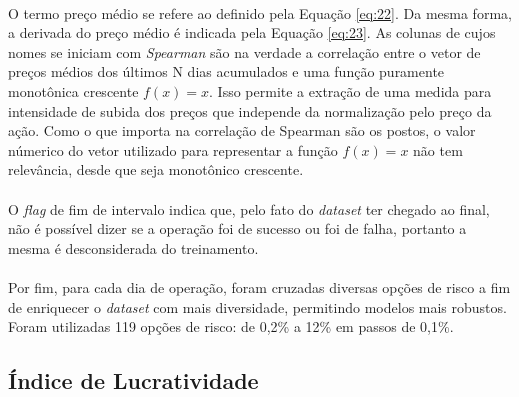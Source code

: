 \paragraph{} O termo preço médio se refere ao definido pela Equação \ref{eq:22}. Da mesma forma, a derivada do preço médio é indicada pela Equação \ref{eq:23}. As colunas de cujos nomes se iniciam com \textit{Spearman} são na verdade a correlação entre o vetor de preços médios dos últimos N dias acumulados e uma função puramente monotônica crescente \begin{math} f(x) = x \end{math}. Isso permite a extração de uma medida para intensidade de subida dos preços que independe da normalização pelo preço da ação. Como o que importa na correlação de Spearman são os postos, o valor númerico do vetor utilizado para representar a função \begin{math} f(x) = x \end{math} não tem relevância, desde que seja monotônico crescente.

\paragraph{} O \textit{flag} de fim de intervalo indica que, pelo fato do \textit{dataset} ter chegado ao final, não é possível dizer se a operação foi de sucesso ou foi de falha, portanto a mesma é desconsiderada do treinamento.

\paragraph{} Por fim, para cada dia de operação, foram cruzadas diversas opções de risco a fim de enriquecer o \textit{dataset} com mais diversidade, permitindo modelos mais robustos. Foram utilizadas 119 opções de risco: de 0,2\% a 12\% em passos de 0,1\%.



\FloatBarrier
\subsection{Índice de Lucratividade}

